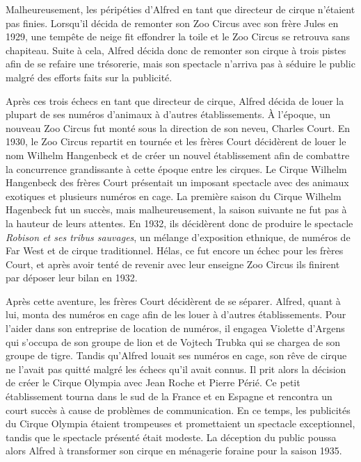Malheureusement, les péripéties d’Alfred en tant que directeur de cirque n’étaient pas finies. Lorsqu’il décida de remonter son Zoo Circus avec son frère Jules en 1929, une tempête de neige fit effondrer la toile et le Zoo Circus se retrouva sans chapiteau. Suite à cela, Alfred décida donc de remonter son cirque à trois pistes afin de se refaire une trésorerie, mais son spectacle n’arriva pas à séduire le public malgré des efforts faits sur la publicité.

Après ces trois échecs en tant que directeur de cirque, Alfred décida de louer la plupart de ses numéros d’animaux à d’autres établissements. À l’époque, un nouveau Zoo Circus fut monté sous la direction de son neveu, Charles Court. En 1930, le Zoo Circus repartit en tournée et les frères Court décidèrent de louer le nom Wilhelm Hangenbeck et de créer un nouvel établissement afin de combattre la concurrence grandissante à cette époque entre les cirques. Le Cirque Wilhelm Hangenbeck des frères Court présentait un imposant spectacle avec des animaux exotiques et plusieurs numéros en cage. La première saison du Cirque Wilhelm Hagenbeck fut un succès, mais malheureusement, la saison suivante ne fut pas à la hauteur de leurs attentes. En 1932, ils décidèrent donc de produire le spectacle \textit{Robison et ses tribus sauvages}, un mélange d’exposition ethnique, de numéros de Far West et de cirque traditionnel. Hélas, ce fut encore un échec pour les frères Court, et après avoir tenté de revenir avec leur enseigne Zoo Circus ils finirent par déposer leur bilan en 1932.

Après cette aventure, les frères Court décidèrent de se séparer. Alfred, quant à lui, monta des numéros en cage afin de les louer à d’autres établissements. Pour l’aider dans son entreprise de location de numéros, il engagea Violette d’Argens qui s’occupa de son groupe de lion et de Vojtech Trubka qui se chargea de son groupe de tigre. Tandis qu’Alfred louait ses numéros en cage, son rêve de cirque ne l’avait pas quitté malgré les échecs qu’il avait connus. Il prit alors la décision de créer le Cirque Olympia avec Jean Roche et Pierre Périé. Ce petit établissement tourna dans le sud de la France et en Espagne et rencontra un court succès à cause de problèmes de communication. En ce temps, les publicités du Cirque Olympia étaient trompeuses et promettaient un spectacle exceptionnel, tandis que le spectacle présenté était modeste. La déception du public poussa alors Alfred à transformer son cirque en ménagerie foraine pour la saison 1935.


